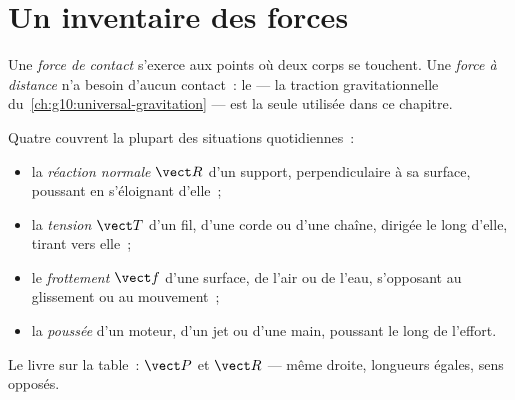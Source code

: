 \section{Un inventaire des forces}

\begin{definition}\label{def:g10:inertia:contact}
Une \emph{force de contact} s'exerce aux points
où deux corps se touchent. Une \emph{force à distance} n'a besoin d'aucun contact~: le  --- la traction
gravitationnelle du~\cref{ch:g10:universal-gravitation} --- est la seule
utilisée dans ce chapitre.
\end{definition}

\begin{definition}\label{def:g10:inertia:inventory}
Quatre  couvrent la plupart des situations
quotidiennes~:
\begin{itemize}
  \item la \emph{réaction normale} $\vect R$
        d'un support, perpendiculaire à sa surface, poussant en
        s'éloignant d'elle~;
  \item la \emph{tension} $\vect T$ d'un fil, d'une
        corde ou d'une chaîne, dirigée le long d'elle, tirant vers
        elle~;
  \item le \emph{frottement} $\vect f$ d'une
        surface, de l'air ou de l'eau, s'opposant au glissement ou au
        mouvement~;
  \item la \emph{poussée} d'un moteur, d'un jet ou d'une
        main, poussant le long de l'effort.
\end{itemize}
\end{definition}

\begin{omfigure}

{\small Le livre sur la table~:  $\vect P$ et
 $\vect R$ --- même droite, longueurs égales,
sens opposés.}
\end{omfigure}

